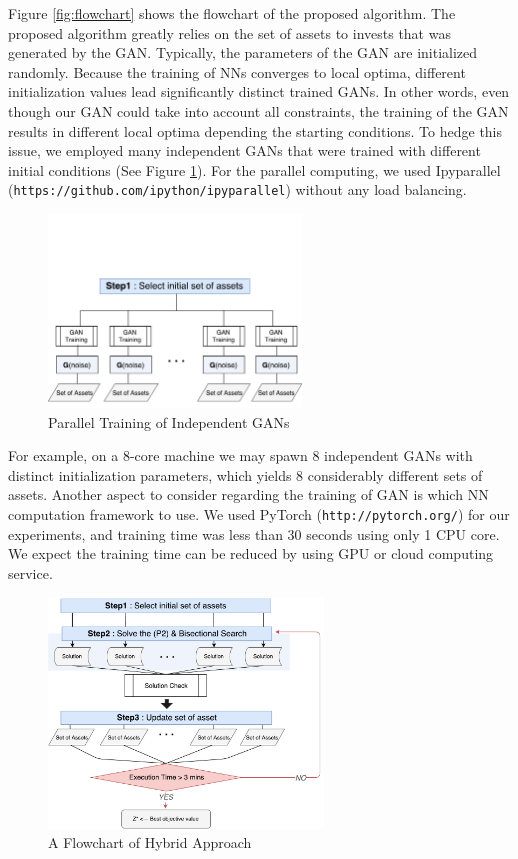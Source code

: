 \documentclass[11pt]{article}
\begin{document}
Figure \ref{fig:flowchart} shows the flowchart of the proposed algorithm. The proposed algorithm greatly relies on the set of assets to invests that was generated by the GAN. Typically, the parameters of the GAN are initialized randomly. Because the training of NNs converges to local optima, different initialization values lead significantly distinct trained GANs. In other words, even though our GAN could take into account all constraints, the training of the GAN results in different local optima depending the starting conditions. To hedge this issue, we employed many independent GANs that were trained with different initial conditions (See Figure \ref{fig:parallelGAN}). For the parallel computing, we used Ipyparallel (\texttt{https://github.com/ipython/ipyparallel}) without any load balancing. 
\begin{figure}[] 
	\begin{center}
		\includegraphics[width=0.6\textwidth]{step1}
		\caption{Parallel Training of Independent GANs} \label{fig:parallelGAN}
	\end{center}
\end{figure}
For example, on a 8-core machine we may spawn 8 independent GANs with distinct initialization parameters, which yields 8 considerably different sets of assets. Another aspect to consider regarding the training of GAN is which NN computation framework to use. We used PyTorch (\texttt{http://pytorch.org/}) for our experiments, and training time was less than 30 seconds using only 1 CPU core. We expect the training time can be reduced by using GPU or cloud computing service. 

\begin{figure}[] 
	\begin{center}
		\includegraphics[width=0.65\textwidth]{step3}
		\caption{A Flowchart of Hybrid Approach} \label{fig:entire}
	\end{center}
\end{figure}
\end{document}
